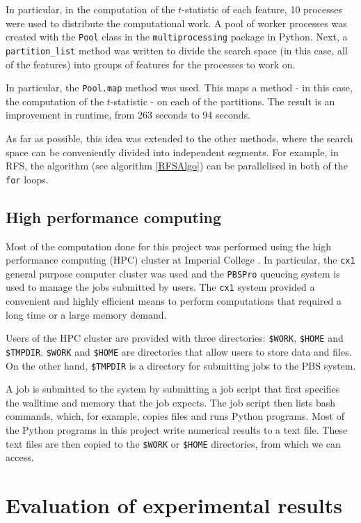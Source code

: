 \documentclass[12pt, twoside, a4paper]{report}
\begin{document}
In particular, in the computation of the $t$-statistic of each feature, 10 processes were used to distribute the computational work. A pool of worker processes was created with the \texttt{Pool} class in the \texttt{multiprocessing} package in Python. Next, a \texttt{partition\_list} method was written to divide the search space (in this case, all of the features) into groups of features for the processes to work on.

In particular, the \texttt{Pool.map} method was used. This maps a method - in this case, the computation of the $t$-statistic - on each of the partitions. The result is an improvement in runtime, from 263 seconds to 94 seconds.

As far as possible, this idea was extended to the other methods, where the search space can be conveniently divided into independent segments. For example, in RFS, the algorithm (see algorithm \ref{RFSAlgo}) can be parallelised in both of the \texttt{for} loops.

\section{High performance computing}

Most of the computation done for this project was performed using the high performance computing (HPC) cluster at Imperial College \cite{RefWorks:218}. In particular, the \texttt{cx1} general purpose computer cluster was used and the \texttt{PBSPro} queueing system is used to manage the jobs submitted by users. The \texttt{cx1} system provided a convenient and highly efficient means to perform computations that required a long time or a large memory demand.

Users of the HPC cluster are provided with three directories: \texttt{\$WORK}, \texttt{\$HOME} and \texttt{\$TMPDIR}. \texttt{\$WORK} and \texttt{\$HOME} are directories that allow users to store data and files. On the other hand, \texttt{\$TMPDIR} is a directory for submitting jobs to the PBS system.

A job is submitted to the system by submitting a job script that first specifies the walltime and memory that the job expects. The job script then lists bash commands, which, for example, copies files and runs Python programs. Most of the Python programs in this project write numerical results to a text file. These text files are then copied to the \texttt{\$WORK} or \texttt{\$HOME} directories, from which we can access.


\chapter{Evaluation of experimental results}
\label{evaluation}
\end{document}
